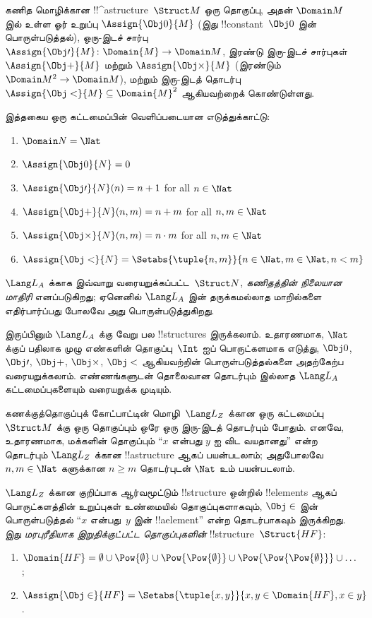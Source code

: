 \documentclass[../../../include/open-logic-section]{subfiles}
\begin{document}
\begin{ex}
கணித மொழிக்கான !!^a{structure}~$\Struct M$ ஒரு தொகுப்பு, அதன்
$\Domain M$ இல் உள்ள ஓர் உறுப்பு $\Assign{\Obj 0}{M}$ (இது
!!{constant}~$\Obj 0$ இன் பொருள்படுத்தல்), ஒரு-இடச் சார்பு
$\Assign{\Obj \prime}{M} \colon \Domain{M} \to \Domain M$,
இரண்டு இரு-இடச் சார்புகள் $\Assign{\Obj +}{M}$ மற்றும்
$\Assign{\Obj \times}{M}$ (இரண்டும் $\Domain M^2 \to \Domain M$),
மற்றும் இரு-இடத் தொடர்பு $\Assign{\Obj <}{M} \subseteq \Domain{M}^2$
ஆகியவற்றைக் கொண்டுள்ளது.

இத்தகைய ஒரு கட்டமைப்பின் வெளிப்படையான எடுத்துக்காட்டு:
\begin{enumerate}
\item $\Domain N = \Nat$
\item $\Assign{\Obj 0}{N} = 0$
\item $\Assign{\Obj \prime}{N}(n) = n + 1$ for all $n \in \Nat$
\item $\Assign{\Obj +}{N}(n, m) = n + m$ for all $n, m \in \Nat$
\item $\Assign{\Obj \times}{N}(n, m) = n\cdot m$ for all $n, m \in \Nat$
\item $\Assign{\Obj <}{N} = \Setabs{\tuple{n, m}}{n \in \Nat, m \in
  \Nat, n < m}$
\end{enumerate}
$\Lang L_A$ க்காக இவ்வாறு வரையறுக்கப்பட்ட~$\Struct N$,
\emph{கணிதத்தின் நிலையான மாதிரி} எனப்படுகிறது; ஏனெனில் $\Lang L_A$ இன்
தருக்கமல்லாத மாறில்களை எதிர்பார்ப்பது போலவே அது பொருள்படுத்துகிறது.

இருப்பினும் $\Lang L_A$ க்கு வேறு பல !!{structure}s இருக்கலாம். உதாரணமாக,
$\Nat$ க்குப் பதிலாக முழு எண்களின் தொகுப்பு~$\Int$ ஐப் பொருட்களமாக எடுத்து,
$\Obj 0$, $\Obj \prime$, $\Obj +$, $\Obj \times$, $\Obj <$ ஆகியவற்றின்
பொருள்படுத்தல்களை அதற்கேற்ப வரையறுக்கலாம். எண்ணங்களுடன் தொலைவான தொடர்பும்
இல்லாத $\Lang L_A$ கட்டமைப்புகளையும் வரையறுக்க முடியும்.
\end{ex}

\begin{ex}
கணக்குத்தொகுப்புக் கோட்பாட்டின் மொழி~$\Lang L_Z$ க்கான
ஒரு கட்டமைப்பு~$\Struct M$ க்கு ஒரு தொகுப்பும் ஒரே ஒரு இரு-இடத் தொடர்பும் போதும்.
எனவே, உதாரணமாக, மக்களின் தொகுப்பும் ``$x$ என்பது $y$ ஐ விட வயதானது''
என்ற தொடர்பும் $\Lang L_Z$ க்கான !!a{structure} ஆகப் பயன்படலாம்; அதுபோலவே
$n,m \in \Nat$ களுக்கான $n \ge m$ தொடர்புடன் $\Nat$ உம் பயன்படலாம்.

$\Lang L_Z$ க்கான குறிப்பாக ஆர்வமூட்டும் !!{structure} ஒன்றில்
!!{element}s ஆகப் பொருட்களத்தின் உறுப்புகள் உண்மையில் தொகுப்புகளாகவும்,
$\Obj \in$ இன் பொருள்படுத்தல் ``$x$ என்பது~$y$ இன் !!a{element}'' என்ற
தொடர்பாகவும் இருக்கிறது. இது \emph{மரபுரீதியாக இறுதிக்குட்பட்ட
தொகுப்புகளின்} !!{structure}~$\Struct{{HF}}$:
\begin{enumerate}
\item $\Domain{{{HF}}} = \emptyset \cup \Pow{\emptyset} \cup
  \Pow{\Pow{\emptyset}} \cup \Pow{\Pow{\Pow{\emptyset}}} \cup \dots$;
\item $\Assign{\Obj \in}{{{HF}}} = \Setabs{\tuple{x, y}}{x, y \in
  \Domain{{{HF}}}, x \in y}$.
\end{enumerate}
\end{ex}
\end{document}
